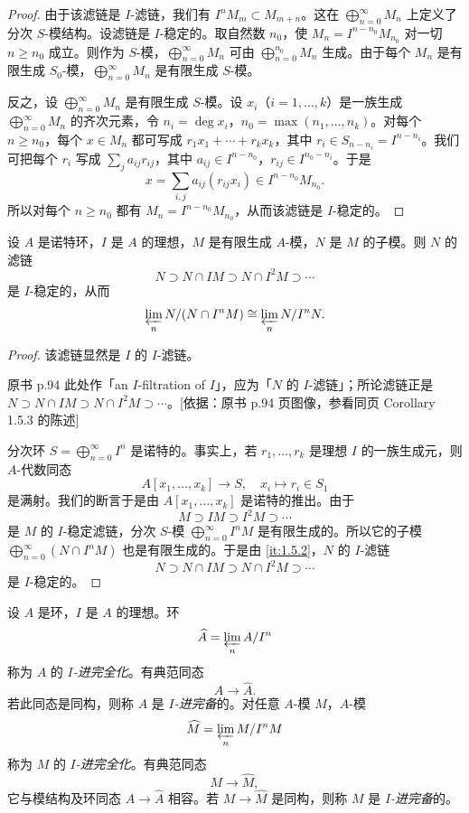 \begin{proof}
由于该滤链是 $I$-滤链，我们有 $I^nM_m\subset M_{m+n}$。这在 $\bigoplus_{n=0}^{\infty}M_n$ 上定义了分次 $S$-模结构。设滤链是 $I$-稳定的。取自然数 $n_0$，使 $M_n=I^{n-n_0}M_{n_0}$ 对一切 $n\ge n_0$ 成立。则作为 $S$-模，$\bigoplus_{n=0}^{\infty}M_n$ 可由 $\bigoplus_{n=0}^{n_0}M_n$ 生成。由于每个 $M_n$ 是有限生成 $S_0$-模，$\bigoplus_{n=0}^{\infty}M_n$ 是有限生成 $S$-模。

反之，设 $\bigoplus_{n=0}^{\infty}M_n$ 是有限生成 $S$-模。设 $x_i$（$i=1,\dots,k$）是一族生成 $\bigoplus_{n=0}^{\infty}M_n$ 的齐次元素，令 $n_i=\deg x_i$，$n_0=\max(n_1,\dots,n_k)$。对每个 $n\ge n_0$，每个 $x\in M_n$ 都可写成 $r_1x_1+\cdots+r_kx_k$，其中 $r_i\in S_{n-n_i}=I^{n-n_i}$。我们可把每个 $r_i$ 写成 $\sum_j a_{ij}r_{ij}$，其中 $a_{ij}\in I^{n-n_0}$，$r_{ij}\in I^{n_0-n_i}$。于是
\[
x=\sum_{i,j}a_{ij}(r_{ij}x_i)\in I^{n-n_0}M_{n_0}.
\]
所以对每个 $n\ge n_0$ 都有 $M_n=I^{n-n_0}M_{n_0}$，从而该滤链是 $I$-稳定的。
\end{proof}

\begin{corollary}\label{it:1.5.3}
设 $A$ 是诺特环，$I$ 是 $A$ 的理想，$M$ 是有限生成 $A$-模，$N$ 是 $M$ 的子模。则 $N$ 的滤链
\[
N\supset N\cap IM\supset N\cap I^2M\supset\cdots
\]
是 $I$-稳定的，从而
\[
\varprojlim_n N/(N\cap I^nM)\cong\varprojlim_n N/I^nN.
\]
\end{corollary}

\begin{proof}
该滤链显然是 $I$ 的 $I$-滤链。
\begin{tnote}
原书 p.94 此处作「an $I$-filtration of $I$」，应为「$N$ 的 $I$-滤链」；所论滤链正是 $N\supset N\cap IM\supset N\cap I^2M\supset\cdots$。[依据：原书 p.94 页图像，参看同页 Corollary 1.5.3 的陈述]
\end{tnote}
分次环 $S=\bigoplus_{n=0}^{\infty}I^n$ 是诺特的。事实上，若 $r_1,\dots,r_k$ 是理想 $I$ 的一族生成元，则 $A$-代数同态
\[
A[x_1,\dots,x_k]\to S,\quad x_i\mapsto r_i\in S_1
\]
是满射。我们的断言于是由 $A[x_1,\dots,x_k]$ 是诺特的推出。由于
\[
M\supset IM\supset I^2M\supset\cdots
\]
是 $M$ 的 $I$-稳定滤链，分次 $S$-模 $\bigoplus_{n=0}^{\infty}I^nM$ 是有限生成的。所以它的子模 $\bigoplus_{n=0}^{\infty}(N\cap I^nM)$ 也是有限生成的。于是由 \ref{it:1.5.2}，$N$ 的 $I$-滤链
\[
N\supset N\cap IM\supset N\cap I^2M\supset\cdots
\]
是 $I$-稳定的。
\end{proof}

设 $A$ 是环，$I$ 是 $A$ 的理想。环
\[
\widehat A=\varprojlim_n A/I^n
\]
称为 $A$ 的 \emph{$I$-进完全化}。有典范同态
\[
A\to\widehat A.
\]
若此同态是同构，则称 $A$ 是 \emph{$I$-进完备}的。对任意 $A$-模 $M$，$A$-模
\[
\widehat M=\varprojlim_n M/I^nM
\]
称为 $M$ 的 \emph{$I$-进完全化}。有典范同态
\[
M\to\widehat M,
\]
它与模结构及环同态 $A\to\widehat A$ 相容。若 $M\to\widehat M$ 是同构，则称 $M$ 是 \emph{$I$-进完备}的。

